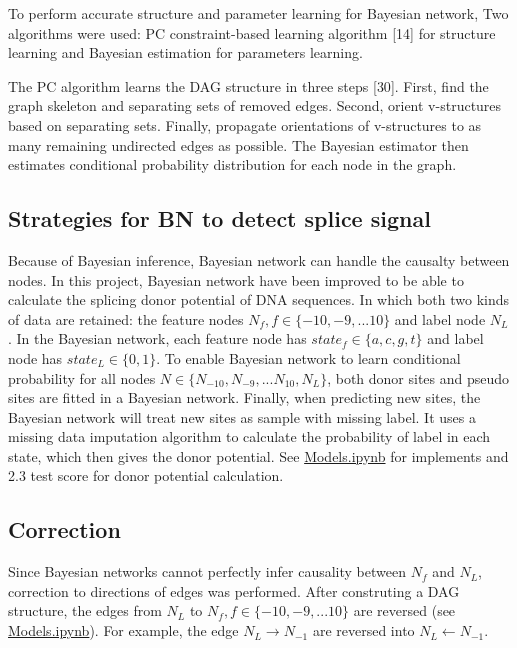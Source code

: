 \documentclass[11pt]{article}
\begin{document}
To perform accurate structure and parameter learning for Bayesian
network, Two algorithms were used: PC constraint-based learning
algorithm {[}14{]} for structure learning and Bayesian estimation for
parameters learning.

The PC algorithm learns the DAG structure in three steps {[}30{]}.
First, find the graph skeleton and separating sets of removed edges.
Second, orient v-structures based on separating sets. Finally, propagate
orientations of v-structures to as many remaining undirected edges as
possible. The Bayesian estimator then estimates conditional probability
distribution for each node in the graph.

    \hypertarget{strategies-for-bn-to-detect-splice-signal}{%
\subsection{Strategies for BN to detect splice
signal}\label{strategies-for-bn-to-detect-splice-signal}}

Because of Bayesian inference, Bayesian network can handle the causalty
between nodes. In this project, Bayesian network have been improved to
be able to calculate the splicing donor potential of DNA sequences. In
which both two kinds of data are retained: the feature nodes
\(N_{f}, f\in \{-10,-9,...10\}\) and label node \(N_L\). In the Bayesian
network, each feature node has \(state_f \in \{a,c,g,t\}\) and label
node has \(state_L\in \{0,1\}\). To enable Bayesian network to learn
conditional probability for all nodes
\(N \in \{N_{-10},N_{-9},...N_{10},N_{L}\}\), both donor sites and
pseudo sites are fitted in a Bayesian network. Finally, when predicting
new sites, the Bayesian network will treat new sites as sample with
missing label. It uses a missing data imputation algorithm to calculate
the probability of label in each state, which then gives the donor
potential. See
\href{https://github.com/AdeBC/GSSR/blob/master/Source/Models.ipynb}{Models.ipynb}
for implements and 2.3 test score for donor potential calculation.

    \hypertarget{correction}{%
\subsection{Correction}\label{correction}}

Since Bayesian networks cannot perfectly infer causality between \(N_f\)
and \(N_L\), correction to directions of edges was performed. After
construting a DAG structure, the edges from \(N_L\) to
\(N_f, f \in \{−10,−9,...10\}\) are reversed (see
\href{https://github.com/AdeBC/GSSR/blob/master/Source/Models.ipynb}{Models.ipynb}).
For example, the edge \(N_L \rightarrow N_{-1}\) are reversed into
\(N_L \leftarrow N_{-1}\).
\end{document}
